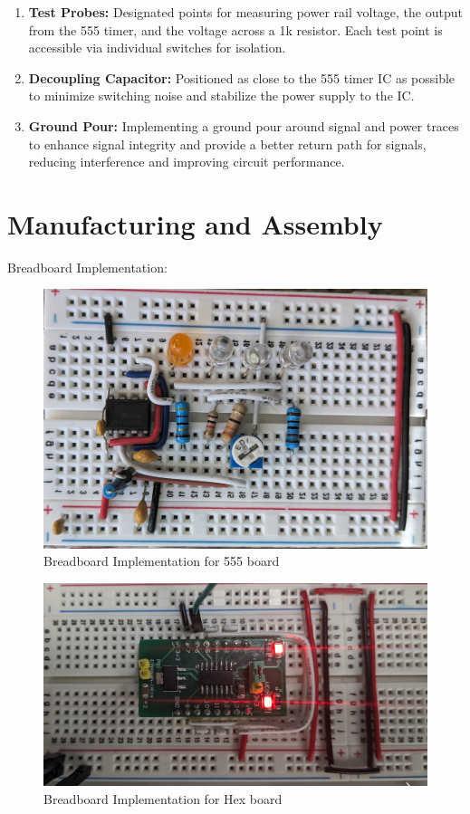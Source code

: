 \documentclass[a4paper,11pt]{article}%
\begin{document}
\begin{enumerate}
	\item \textbf{Test Probes:} Designated points for measuring power rail voltage, the output from the 555 timer, and the voltage across a 1k resistor. Each test point is accessible via individual switches for isolation.
	\item \textbf{Decoupling Capacitor:} Positioned as close to the 555 timer IC as possible to minimize switching noise and stabilize the power supply to the IC.
	\item \textbf{Ground Pour:} Implementing a ground pour around signal and power traces to enhance signal integrity and provide a better return path for signals, reducing interference and improving circuit performance.
\end{enumerate}


\pagebreak
\section{Manufacturing and Assembly}

Breadboard Implementation:


\begin{figure}[H]
	\centering
	\includegraphics[scale=0.2]{figures/breadboard.jpg}
	\caption{Breadboard Implementation for 555 board}
\end{figure}


\begin{figure}[H]
	\centering
	\includegraphics[scale=0.2]{figures/hexboard.jpg}
	\caption{Breadboard Implementation for Hex board}
\end{figure}
\end{document}
